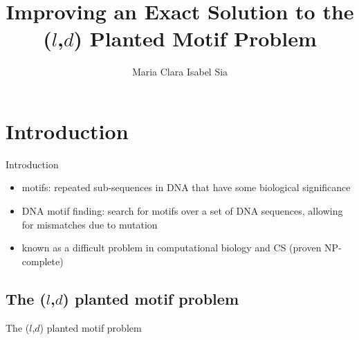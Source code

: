 \documentclass[pdf]{beamer}
\title{Improving an Exact Solution to the \newline ($l$,$d$) Planted Motif Problem}
\author{Maria Clara Isabel Sia}
\begin{document}
\begin{frame}
\titlepage
\end{frame}

\section{Introduction}
	\begin{frame}{Introduction}
		\begin{itemize}
			\item<2-> motifs: repeated sub-sequences in DNA that have some biological significance\newline
			\item<3-> DNA motif finding: search for motifs over a set of DNA sequences, allowing for mismatches due to mutation\newline
			\item<4-> known as a difficult problem in computational biology and CS (proven NP-complete)\newline
		\end{itemize}
		\end{frame}

	\subsection{The ($l$,$d$) planted motif problem}
		\begin{frame}{The ($l$,$d$) planted motif problem}
			\newline


			\end{frame}
\end{document}
